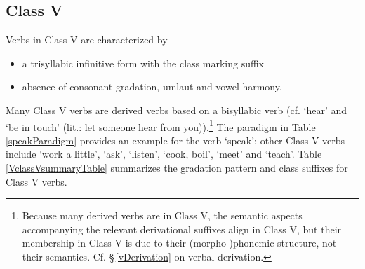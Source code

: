 \clearpage

\subsection{Class V}\label{VclassV}
Verbs in Class V are characterized by 
\begin{itemize}
\item{a trisyllabic infinitive form with the class marking suffix }
\item{absence of consonant gradation, umlaut and vowel harmony.} 
\end{itemize}
Many Class V verbs are derived verbs based on a bisyllabic verb (cf.  ‘hear’ and  ‘be in touch’ (lit.: let someone hear from you)).\footnote{Because many derived verbs are in Class V, the semantic aspects accompanying the relevant derivational suffixes align in Class V, but their membership in Class V is due to their \mbox{(morpho-)phonemic} structure, not their semantics. Cf. §\,\ref{vDerivation} on verbal derivation.} 
The paradigm in Table \vref{speakParadigm} provides an example for the verb  ‘speak’; 
other Class V verbs include  ‘work a little’,  ‘ask’,  ‘listen’,  ‘cook, boil’,  ‘meet’ and  ‘teach’. 
Table \vref{VclassVsummaryTable} summarizes the gradation pattern and class suffixes for Class V verbs. %
